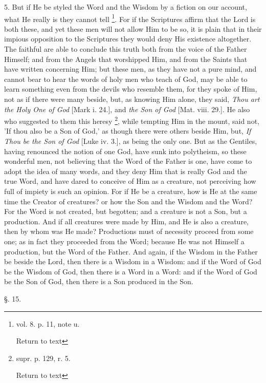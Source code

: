 5. But if He be styled the Word and the Wisdom by
a fiction on our account, what He really is they cannot tell \footnote{vol. 8. p. 11, note u.

Return to text}. For if the Scriptures affirm that the Lord is both these, and yet
these men will not allow Him to be so, it is plain that in their
impious opposition to the Scriptures they would deny His existence
altogether. The faithful are able to conclude this truth both from the
voice of the Father Himself; and from the Angels that worshipped Him,
and from the Saints that have written concerning Him; but these men,
as they have not a pure mind, and cannot bear to hear the words of
holy men who teach of God, may be able to learn something even from
the devils who resemble them, for they spoke of Him, not as if there
were many beside, but, as knowing Him alone, they said, \emph{Thou art
the Holy One of God} [Mark i. 24.], and \emph{the Son of God} [Mat.
viii. 29.]. He also who suggested to them this heresy \footnote{supr. p. 129, r. 5.

Return to text}, while tempting Him in the mount, said not, 'If thou also be a Son
of God,' as though there were others beside Him, but, \emph{If Thou be
the Son of God} [Luke iv. 3.], as being the only one. But as the
Gentiles, having renounced the notion of one God, have sunk into
polytheism, so these wonderful men, not believing that the Word of the
Father is one, have come to adopt the idea of many words, and they
deny Him that is really God and the true Word, and have dared to
conceive of Him as a creature, not perceiving how full of impiety is
such an opinion. For if He be a creature, how is He at the same time
the Creator of creatures? or how the Son and the Wisdom and the Word?
For the Word is not created, but begotten; and a creature is not a
Son, but a production. And if all creatures were made by Him, and He
is also a creature, then by whom was He made? Productions must of
necessity proceed from some one; as in fact they proceeded from
the Word; because He was not Himself a production, but the Word of the
Father. And again, if the Wisdom in the Father be beside the Lord,
then there is a Wisdom in a Wisdom: and if the Word of God be the
Wisdom of God, then there is a Word in a Word: and if the Word of God
be the Son of God, then there is a Son produced in the Son.

§. 15.


